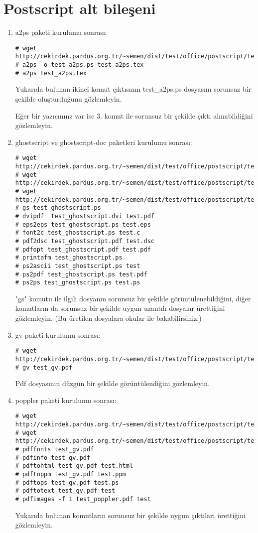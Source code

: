 \documentclass[a4paper,10pt]{article}
\begin{document}
\section{ Postscript alt bileşeni}
\begin{enumerate}
\item a2ps paketi kurulumu sonrası:
\begin{verbatim}
# wget http://cekirdek.pardus.org.tr/~semen/dist/test/office/postscript/test_a2ps.tex
# a2ps -o test_a2ps.ps test_a2ps.tex
# a2ps test_a2ps.tex
\end{verbatim}

Yukarıda bulunan ikinci komut çıktısının test\_a2ps.ps dosyasını sorunsuz bir şekilde oluşturduğunu gözlemleyin.

Eğer bir yazıcınınz var ise 3. komut ile sorunsuz bir şekilde çıktı alınabildiğini gözlemleyin.

\item ghostscript ve ghostscript-doc paketleri kurulumu sonrası:
\begin{verbatim}
# wget http://cekirdek.pardus.org.tr/~semen/dist/test/office/postscript/test_ghostscript.ps
# wget http://cekirdek.pardus.org.tr/~semen/dist/test/office/postscript/test_ghostscript.dvi
# wget http://cekirdek.pardus.org.tr/~semen/dist/test/office/postscript/test_ghostscript.pdf
# gs test_ghostscript.ps
# dvipdf  test_ghostscript.dvi test.pdf
# eps2eps test_ghostscript.ps test.eps
# font2c test_ghostscript.ps test.c
# pdf2dsc test_ghostscript.pdf test.dsc
# pdfopt test_ghostscript.pdf test.pdf
# printafm test_ghostscript.ps
# ps2ascii test_ghostscript.ps test
# ps2pdf test_ghostscript.ps test.pdf
# ps2ps test_ghostscript.ps test.ps
\end{verbatim}

"gs" komutu ile ilgili dosyanın sorunsuz bir şekilde görüntülenebildiğini, diğer komutların da sorunsuz bir şekilde uygun uzantılı dosyalar ürettiğini gözlemleyin. (Bu üretilen dosyalara okular ile bakabilirsiniz.)

\item gv paketi kurulumu sonrası:
\begin{verbatim}
# wget http://cekirdek.pardus.org.tr/~semen/dist/test/office/postscript/test_gv.pdf
# gv test_gv.pdf
\end{verbatim}

Pdf dosyasının düzgün bir şekilde görüntülendiğini gözlemleyin.

\item poppler paketi kurulumu sonrası:
\begin{verbatim}
# wget http://cekirdek.pardus.org.tr/~semen/dist/test/office/postscript/test_gv.pdf
# wget http://cekirdek.pardus.org.tr/~semen/dist/test/office/postscript/test_poppler.pdf
# pdffonts test_gv.pdf
# pdfinfo test_gv.pdf
# pdftohtml test_gv.pdf test.html
# pdftoppm test_gv.pdf test.ppm
# pdftops test_gv.pdf test.ps
# pdftotext test_gv.pdf test
# pdfimages -f 1 test_poppler.pdf test
\end{verbatim}

Yukarıda bulunan komutların sorunsuz bir şekilde uygun çıktıları ürettiğini gözlemleyin.
\end{enumerate}
\end{document}
